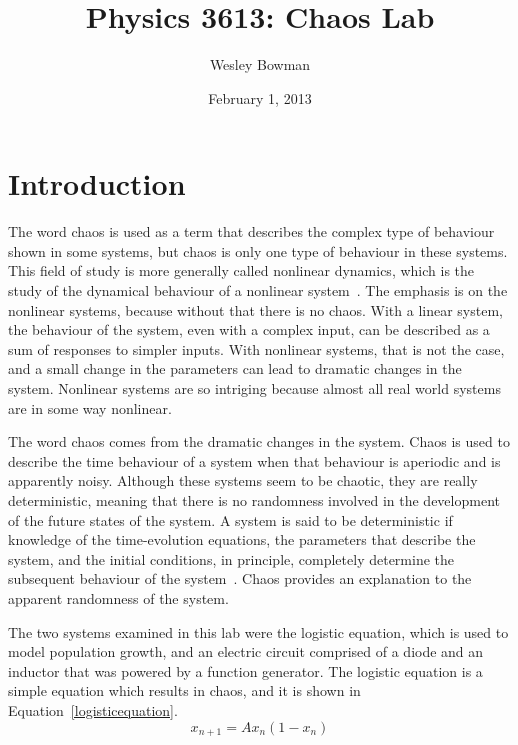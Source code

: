 \documentclass[12pt]{report}
\theoremstyle{definition}
\begin{document}
\title{Physics 3613: Chaos Lab}
\date{February 1, 2013}
\author{Wesley Bowman}
\maketitle
\pagebreak

\tableofcontents

\pagebreak
%
%

\section*{Introduction}
The word chaos is used as a term that describes the complex type of behaviour shown in some systems, but chaos is only one type of behaviour in these systems. This field of study is more generally called nonlinear dynamics, which is the study of the dynamical behaviour of a nonlinear system~\cite{hilborn}. The emphasis is on the nonlinear systems, because without that there is no chaos. With a linear system, the behaviour of the system, even with a complex input, can be described as a sum of responses to simpler inputs. With nonlinear systems, that is not the case, and a small change in the parameters can lead to dramatic changes in the system. Nonlinear systems are so intriging because almost all real world systems are in some way nonlinear. 

The word chaos comes from the dramatic changes in the system. Chaos is used to describe the time behaviour of a system when that behaviour is aperiodic and is apparently noisy. Although these systems seem to be chaotic, they are really deterministic, meaning that there is no randomness involved in the development  of the future states of the system. A system is said to be deterministic if knowledge of the time-evolution equations, the parameters that describe the system, and the initial conditions, in principle, completely determine the subsequent behaviour of the system~\cite{hilborn}. Chaos provides an explanation to the apparent randomness of the system. 

The two systems examined in this lab were the logistic equation, which is used to model population growth, and an electric circuit comprised of a diode and an inductor that was powered by a function generator. The logistic equation is a simple equation which results in chaos, and it is shown in Equation~\ref{logisticequation}.
\begin{equation}
x_{n+1}=Ax_n(1-x_n)
\label{logisticequation}
\end{equation}
\end{document}

